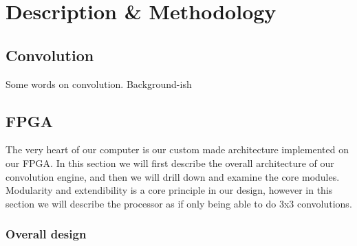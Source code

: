 \chapter{Description \& Methodology}

\section{Convolution}
Some words on convolution. Background-ish

\section{FPGA}

The very heart of our computer is our custom made architecture implemented on our FPGA.
In this section we will first describe the overall architecture of our convolution engine, and then we will drill down and examine the core modules.
Modularity and extendibility is a core principle in our design, however in this section we will describe the processor as if only being able to do 3x3 convolutions.

\subsection{Overall design}

